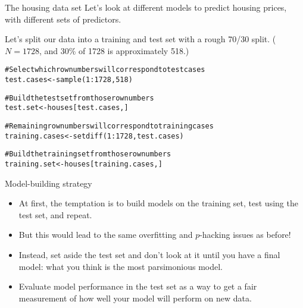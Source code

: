 \documentclass{beamer}\usepackage[]{graphicx}\usepackage[]{color}
\makeatletter
\newcommand{\hlnum}[1]{\textcolor[rgb]{0.824,0.412,0.118}{#1}}%
\newcommand{\hlcom}[1]{\textcolor[rgb]{0.824,0.706,0.549}{#1}}%
\newcommand{\hlopt}[1]{\textcolor[rgb]{1,0.894,0.769}{#1}}%
\newcommand{\hlstd}[1]{\textcolor[rgb]{1,0.894,0.769}{#1}}%
\newcommand{\hlkwb}[1]{\textcolor[rgb]{0.804,0.776,0.451}{#1}}%
\newcommand{\hlkwd}[1]{\textcolor[rgb]{1,0.78,0.769}{#1}}%
\newenvironment{kframe}{%
 \def\at@end@of@kframe{}%
 \ifinner\ifhmode%
  \def\at@end@of@kframe{\end{minipage}}%
  \begin{minipage}{\columnwidth}%
 \fi\fi%
 \def\FrameCommand##1{\hskip\@totalleftmargin \hskip-\fboxsep
 \colorbox{shadecolor}{##1}\hskip-\fboxsep
     \hskip-\linewidth \hskip-\@totalleftmargin \hskip\columnwidth}%
 \MakeFramed {\advance\hsize-\width
   \@totalleftmargin\z@ \linewidth\hsize
   \@setminipage}}%
 {\par\unskip\endMakeFramed%
 \at@end@of@kframe}
\newenvironment{knitrout}{}{} %
\makeatother
\begin{document}
\begin{darkframes}
    \begin{frame}{The housing data set}
      Let's look at different models to predict housing prices, with different sets of predictors.
    \end{frame}

    \begin{frame}[fragile]
      Let's split our data into a training and test set with a rough 70/30 split. ($N=1728$, and 30\% of 1728 is approximately 518.)

      \fontsm
\begin{knitrout}
\color{fgcolor}\begin{kframe}
\begin{alltt}
\hlcom{# Select which row numbers will correspond to test cases}
\hlstd{test.cases} \hlkwb{<-} \hlkwd{sample}\hlstd{(}\hlnum{1}\hlopt{:}\hlnum{1728}\hlstd{,} \hlnum{518}\hlstd{)}

\hlcom{# Build the test set from those row numbers}
\hlstd{test.set} \hlkwb{<-} \hlstd{houses[test.cases,]}

\hlcom{# Remaining row numbers will correspond to training cases}
\hlstd{training.cases} \hlkwb{<-} \hlkwd{setdiff}\hlstd{(}\hlnum{1}\hlopt{:}\hlnum{1728}\hlstd{, test.cases)}

\hlcom{# Build the training set from those row numbers}
\hlstd{training.set} \hlkwb{<-} \hlstd{houses[training.cases,]}
\end{alltt}
\end{kframe}
\end{knitrout}
    \end{frame}

    \begin{frame}{Model-building strategy}
      \begin{itemize}[<+->]
        \item At first, the temptation is to build models on the training set, test using the test set, and repeat.
        \item But this would lead to the same overfitting and $p$-hacking issues as before!
        \item Instead, set aside the test set and don't look at it until you have a final model: what you think is the most parsimonious model.
        \item Evaluate model performance in the test set as a way to get a fair measurement of how well your model will perform on new data.
      \end{itemize}
    \end{frame}


\end{darkframes}
\end{document}
